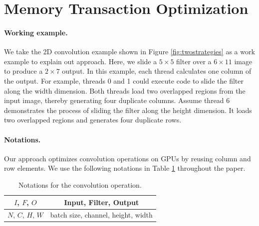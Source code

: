 \section{Memory Transaction Optimization}
\label{sec:strategies}

\paragraph{Working example.} We take the 2D convolution example shown in Figure \ref{fig:twostrategies} as a work example to explain out approach. Here, we slide a $5
\times 5$ filter over a $6 \times 11$ image to produce a $2 \times 7$ output. In this example, each thread calculates one column of the
output. For example, threads 0 and 1 could execute code to slide the filter along the width dimension. Both threads load two overlapped
regions from the input image, thereby generating four duplicate columns. Assume thread 6 demonstrates the process of sliding the filter
along the height dimension. It loads two overlapped regions and generates four duplicate rows.


\paragraph{Notations.} Our approach optimizes convolution operations on GPUs by reusing column and row elements. We use the following notations in Table
\ref{tab:notations} throughout the paper.

\begin{table}[t!]
\centering
\caption{Notations for the convolution operation.}
	\begin{tabular}{c|c}
	\hline
		$I$, $F$, $O$ & Input, Filter, Output \\
		\hline
		$N$, $C$, $H$, $W$ & batch size, channel, height, width\\
		\hline
	\end{tabular}
	\label{tab:notations}
\end{table}

